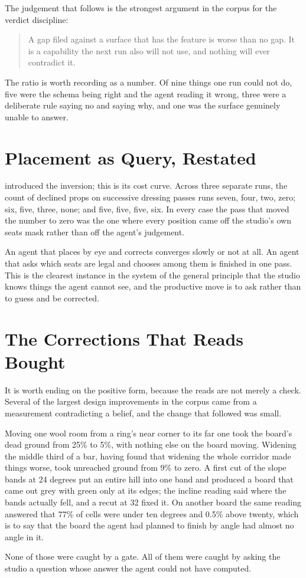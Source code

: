 The judgement that follows is the strongest argument in the corpus for the verdict
discipline:

\begin{quote}
A gap filed against a surface that has the feature is worse than no gap. It is a
capability the next run also will not use, and nothing will ever contradict it.
\end{quote}

The ratio is worth recording as a number. Of nine things one run could not do,
five were the schema being right and the agent reading it wrong, three were a
deliberate rule saying no and saying why, and one was the surface genuinely unable
to answer.

\section{Placement as Query, Restated}

 introduced the inversion; this is its cost curve. Across three
separate runs, the count of declined props on successive dressing passes runs
seven, four, two, zero; six, five, three, none; and five, five, five, six. In every
case the pass that moved the number to zero was the one where every position came
off the studio's own seats mask rather than off the agent's judgement.

An agent that places by eye and corrects converges slowly or not at all. An agent
that asks which seats are legal and chooses among them is finished in one pass.
This is the clearest instance in the system of the general principle that the
studio knows things the agent cannot see, and the productive move is to ask rather
than to guess and be corrected.

\section{The Corrections That Reads Bought}

It is worth ending on the positive form, because the reads are not merely a check.
Several of the largest design improvements in the corpus came from a measurement
contradicting a belief, and the change that followed was small.

Moving one wool room from a ring's near corner to its far one took the board's dead
ground from 25\% to 5\%, with nothing else on the board moving. Widening the middle
third of a bar, having found that widening the whole corridor made things worse,
took unreached ground from 9\% to zero. A first cut of the slope bands at
24 degrees put an entire hill into one band and produced a board that came out grey
with green only at its edges; the incline reading said where the bands actually
fell, and a recut at 32 fixed it. On another board the same reading answered that
77\% of cells were under ten degrees and 0.5\% above twenty, which is to say that
the board the agent had planned to finish by angle had almost no angle in it.

None of those were caught by a gate. All of them were caught by asking the studio a
question whose answer the agent could not have computed.
